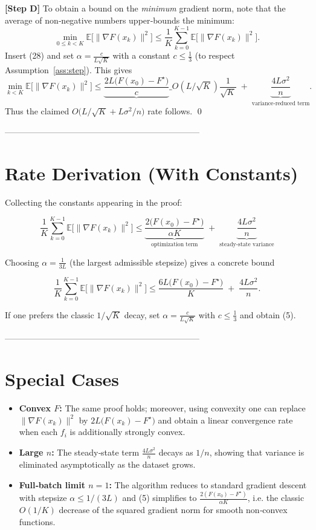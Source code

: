 \documentclass{article}
\newcommand{\E}{\mathbb{E}}
\begin{document}
\noindent\textbf{[Step D]} To obtain a bound on the \emph{minimum} gradient norm, note that the average of non‑negative numbers upper‑bounds the minimum:
\[
\min_{0\le k<K}\E\big[\|\nabla F(x_k)\|^{2}\big]
\le \frac{1}{K}\sum_{k=0}^{K-1}\E\big[\|\nabla F(x_k)\|^{2}\big].
\]
Insert (28) and set $\alpha=\frac{c}{L\sqrt{K}}$ with a constant $c\le \frac{1}{3}$ (to respect Assumption~\ref{ass:step}). This gives
\[
\min_{k<K}\E\big[\|\nabla F(x_k)\|^{2}\big]
\le
\underbrace{\frac{2L\big(F(x_0)-F^{\star}\big)}{c}}\_{O(L/\sqrt{K})}
\frac{1}{\sqrt{K}}
\;+\;
\underbrace{\frac{4L\sigma^{2}}{n}}_{\text{variance‑reduced term}}.
\]
Thus the claimed $O\!\big(L/\sqrt{K}+L\sigma^{2}/n\big)$ rate follows. \qed

---------------------------------------------------------------------

\section*{Rate Derivation (With Constants)}

Collecting the constants appearing in the proof:

\[
\boxed{
\frac{1}{K}\sum_{k=0}^{K-1}\E\big[\|\nabla F(x_k)\|^{2}\big]
\le
\underbrace{\frac{2\big(F(x_0)-F^{\star}\big)}{\alpha K}}_{\text{optimization term}}
\;+\;
\underbrace{\frac{4L\sigma^{2}}{n}}_{\text{steady‑state variance}}
}
\tag{29}
\]

Choosing $\alpha = \frac{1}{3L}$ (the largest admissible stepsize) gives a concrete bound

\[
\frac{1}{K}\sum_{k=0}^{K-1}\E\big[\|\nabla F(x_k)\|^{2}\big]
\le
\frac{6L\big(F(x_0)-F^{\star}\big)}{K}
\;+\;
\frac{4L\sigma^{2}}{n}.
\tag{30}
\]

If one prefers the classic $1/\sqrt{K}$ decay, set $\alpha = \frac{c}{L\sqrt{K}}$ with $c\le \tfrac13$ and obtain (5).

---------------------------------------------------------------------

\section*{Special Cases}

\begin{itemize}
\item \textbf{Convex $F$:} The same proof holds; moreover, using convexity one can replace $\|\nabla F(x_k)\|^{2}$ by $2L\big(F(x_k)-F^{\star}\big)$ and obtain a linear convergence rate when each $f_i$ is additionally strongly convex.
\item \textbf{Large $n$:} The steady‑state term $\frac{4L\sigma^{2}}{n}$ decays as $1/n$, showing that variance is eliminated asymptotically as the dataset grows.
\item \textbf{Full‑batch limit $n=1$:} The algorithm reduces to standard gradient descent with stepsize $\alpha\le 1/(3L)$ and (5) simplifies to $\frac{2(F(x_0)-F^{\star})}{\alpha K}$, i.e. the classic $O(1/K)$ decrease of the squared gradient norm for smooth non‑convex functions.
\end{itemize}
\end{document}
